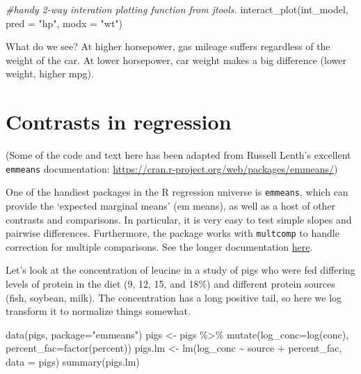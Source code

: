 \documentclass[
]{book}
\newenvironment{Shaded}{\begin{snugshade}}{\end{snugshade}}
\newcommand{\AttributeTok}[1]{\textcolor[rgb]{0.77,0.63,0.00}{#1}}
\newcommand{\CommentTok}[1]{\textcolor[rgb]{0.56,0.35,0.01}{\textit{#1}}}
\newcommand{\FunctionTok}[1]{\textcolor[rgb]{0.00,0.00,0.00}{#1}}
\newcommand{\NormalTok}[1]{#1}
\newcommand{\OtherTok}[1]{\textcolor[rgb]{0.56,0.35,0.01}{#1}}
\newcommand{\SpecialCharTok}[1]{\textcolor[rgb]{0.00,0.00,0.00}{#1}}
\newcommand{\StringTok}[1]{\textcolor[rgb]{0.31,0.60,0.02}{#1}}
\begin{document}
\begin{Shaded}
\begin{Highlighting}[]
\CommentTok{\#handy 2{-}way interation plotting function from jtools.}
\FunctionTok{interact\_plot}\NormalTok{(int\_model, }\AttributeTok{pred =} \StringTok{"hp"}\NormalTok{, }\AttributeTok{modx =} \StringTok{"wt"}\NormalTok{)}
\end{Highlighting}
\end{Shaded}

What do we see? At higher horsepower, gas mileage suffers regardless of the weight of the car. At lower horsepower, car weight makes a big difference (lower weight, higher mpg).

\hypertarget{contrasts-in-regression}{%
\section{Contrasts in regression}\label{contrasts-in-regression}}

(Some of the code and text here has been adapted from Russell Lenth's excellent \texttt{emmeans} documentation: \url{https://cran.r-project.org/web/packages/emmeans/})

One of the handiest packages in the R regression universe is \texttt{emmeans}, which can provide the `expected marginal means' (em means), as well as a host of other contrasts and comparisons. In particular, it is very easy to test simple slopes and pairwise differences. Furthermore, the package works with \texttt{multcomp} to handle correction for multiple comparisons. See the longer documentation \href{https://cran.r-project.org/web/packages/emmeans/vignettes/comparisons.html}{here}.

Let's look at the concentration of leucine in a study of pigs who were fed differing levels of protein in the diet (9, 12, 15, and 18\%) and different protein sources (fish, soybean, milk). The concentration has a long positive tail, so here we log transform it to normalize things somewhat.

\begin{Shaded}
\begin{Highlighting}[]
\FunctionTok{data}\NormalTok{(pigs, }\AttributeTok{package=}\StringTok{"emmeans"}\NormalTok{)}
\NormalTok{pigs }\OtherTok{\textless{}{-}}\NormalTok{ pigs }\SpecialCharTok{\%\textgreater{}\%} \FunctionTok{mutate}\NormalTok{(}\AttributeTok{log\_conc=}\FunctionTok{log}\NormalTok{(conc), }\AttributeTok{percent\_fac=}\FunctionTok{factor}\NormalTok{(percent))}
\NormalTok{pigs.lm }\OtherTok{\textless{}{-}} \FunctionTok{lm}\NormalTok{(log\_conc }\SpecialCharTok{\textasciitilde{}}\NormalTok{ source }\SpecialCharTok{+}\NormalTok{ percent\_fac, }\AttributeTok{data =}\NormalTok{ pigs)}
\FunctionTok{summary}\NormalTok{(pigs.lm)}
\end{Highlighting}
\end{Shaded}
\end{document}
